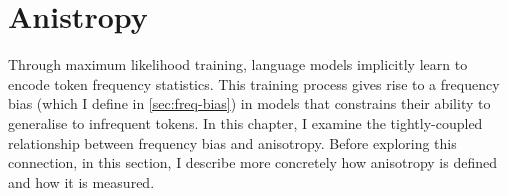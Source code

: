 \section{Anistropy}
\label{sec:anisotropy-background}

Through maximum likelihood training, language models implicitly learn to encode token frequency statistics. This training process gives rise to a frequency bias (which I define in \cref{sec:freq-bias}) in models that constrains their ability to generalise to infrequent tokens. In this chapter, I examine the tightly-coupled relationship between frequency bias and anisotropy. Before exploring this connection, in this section, I describe more concretely how anisotropy is defined and how it is measured.




